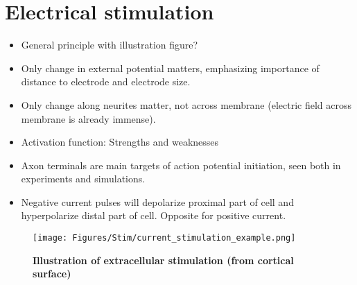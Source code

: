 \section{Electrical stimulation}
\label{sec:Stim}

\begin{itemize}
\item General principle with illustration figure?
\item Only change in external potential matters, emphasizing importance of distance to electrode and electrode size.
\item Only change along neurites matter, not across membrane (electric field across membrane is already immense).
\item Activation function: Strengths and weaknesses
\item Axon terminals are main targets of action potential initiation, seen both in experiments and simulations.
\item Negative current pulses will depolarize proximal part of cell and hyperpolarize distal part of cell. Opposite for positive current.
\end{itemize}

\begin{figure}[!ht]
\begin{center}
\texttt{[image: Figures/Stim/current\_stimulation\_example.png]}
\end{center}
\caption{\textbf{Illustration of extracellular stimulation (from cortical surface)} 
}
\label{Stim:fig:current_stimulation_example}
\end{figure}
